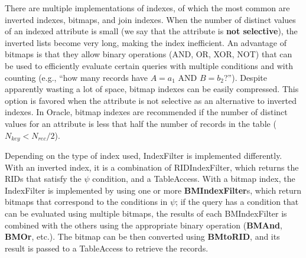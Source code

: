 There are multiple implementations of indexes, of which the most common are inverted indexes, bitmaps, and join indexes. 
When the number of distinct values of an indexed attribute is small (we say that the attribute is \textbf{not selective}), the inverted lists become very long, making the index inefficient.
An advantage of bitmaps is that they allow binary operations (AND, OR, XOR, NOT) that can be used to efficiently evaluate certain queries with multiple conditions and with counting (e.g., ``how many records have $A=a_1$ AND $B=b_2$?''). Despite apparently wasting a lot of space, bitmap indexes can be easily compressed. This option is favored when the attribute is not selective as an alternative to inverted indexes. In Oracle, bitmap indexes are recommended if the number of distinct values for an attribute is less that half the number of records in the table ($N_{key} < N_{rec}/2$).

Depending on the type of index used, IndexFilter is implemented differently. With an inverted index, it is a combination of RIDIndexFilter, which returns the RIDs that satisfy the $\psi$ condition, and a TableAccess. With a bitmap index, the IndexFilter is implemented by using one or more \textbf{BMIndexFilter}s, which return bitmaps that correspond to the conditions in $\psi$; if the query has a condition that can be evaluated using multiple bitmaps, the results of each BMIndexFilter is combined with the others using the appropriate binary operation (\textbf{BMAnd}, \textbf{BMOr}, etc.). The bitmap can be then converted using \textbf{BMtoRID}, and its result is passed to a TableAccess to retrieve the records.

